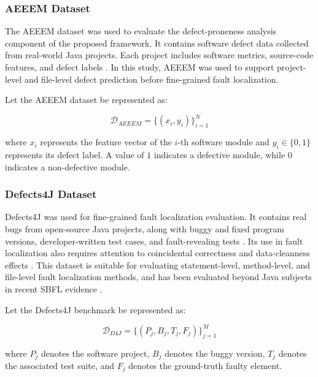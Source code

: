\documentclass[article,article,submit,pdftex,moreauthors]{Definitions/mdpi}
\begin{document}
\subsubsection{AEEEM Dataset}

The AEEEM dataset was used to evaluate the defect-proneness analysis component of the proposed framework. It contains software defect data collected from real-world Java projects. Each project includes software metrics, source-code features, and defect labels \cite{dambros2010aeeem}. In this study, AEEEM was used to support project-level and file-level defect prediction before fine-grained fault localization.

Let the AEEEM dataset be represented as:

\begin{equation}
\mathcal{D}_{AEEEM} = \{(x_i, y_i)\}_{i=1}^{N}
\end{equation}

where $x_i$ represents the feature vector of the $i$-th software module and $y_i \in \{0,1\}$ represents its defect label. A value of $1$ indicates a defective module, while $0$ indicates a non-defective module.

\subsubsection{Defects4J Dataset}

Defects4J was used for fine-grained fault localization evaluation. It contains real bugs from open-source Java projects, along with buggy and fixed program versions, developer-written test cases, and fault-revealing tests \cite{just2014defects4j}. Its use in fault localization also requires attention to coincidental correctness and data-cleanness effects \cite{abouassi2019coincidental,rafi2024cleanness}. This dataset is suitable for evaluating statement-level, method-level, and file-level fault localization methods, and has been evaluated beyond Java subjects in recent SBFL evidence \cite{widyasari2022python}.

Let the Defects4J benchmark be represented as:

\begin{equation}
\mathcal{D}_{D4J} = \{(P_j, B_j, T_j, F_j)\}_{j=1}^{M}
\end{equation}

where $P_j$ denotes the software project, $B_j$ denotes the buggy version, $T_j$ denotes the associated test suite, and $F_j$ denotes the ground-truth faulty element.
\end{document}
